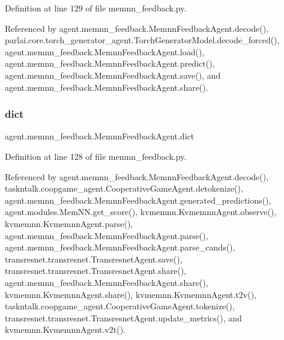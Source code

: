 Definition at line 129 of file memnn\+\_\+feedback.\+py.



Referenced by agent.\+memnn\+\_\+feedback.\+Memnn\+Feedback\+Agent.\+decode(), parlai.\+core.\+torch\+\_\+generator\+\_\+agent.\+Torch\+Generator\+Model.\+decode\+\_\+forced(), agent.\+memnn\+\_\+feedback.\+Memnn\+Feedback\+Agent.\+load(), agent.\+memnn\+\_\+feedback.\+Memnn\+Feedback\+Agent.\+predict(), agent.\+memnn\+\_\+feedback.\+Memnn\+Feedback\+Agent.\+save(), and agent.\+memnn\+\_\+feedback.\+Memnn\+Feedback\+Agent.\+share().

\mbox{\label{classagent_1_1memnn__feedback_1_1MemnnFeedbackAgent_a62aa745115d5a92505ba3009729d847b}} 
\subsubsection{\texorpdfstring{dict}{dict}}
{\footnotesize\ttfamily agent.\+memnn\+\_\+feedback.\+Memnn\+Feedback\+Agent.\+dict}



Definition at line 128 of file memnn\+\_\+feedback.\+py.



Referenced by agent.\+memnn\+\_\+feedback.\+Memnn\+Feedback\+Agent.\+decode(), taskntalk.\+coopgame\+\_\+agent.\+Cooperative\+Game\+Agent.\+detokenize(), agent.\+memnn\+\_\+feedback.\+Memnn\+Feedback\+Agent.\+generated\+\_\+predictions(), agent.\+modules.\+Mem\+N\+N.\+get\+\_\+score(), kvmemnn.\+Kvmemnn\+Agent.\+observe(), kvmemnn.\+Kvmemnn\+Agent.\+parse(), agent.\+memnn\+\_\+feedback.\+Memnn\+Feedback\+Agent.\+parse(), agent.\+memnn\+\_\+feedback.\+Memnn\+Feedback\+Agent.\+parse\+\_\+cands(), transresnet.\+transresnet.\+Transresnet\+Agent.\+save(), transresnet.\+transresnet.\+Transresnet\+Agent.\+share(), agent.\+memnn\+\_\+feedback.\+Memnn\+Feedback\+Agent.\+share(), kvmemnn.\+Kvmemnn\+Agent.\+share(), kvmemnn.\+Kvmemnn\+Agent.\+t2v(), taskntalk.\+coopgame\+\_\+agent.\+Cooperative\+Game\+Agent.\+tokenize(), transresnet.\+transresnet.\+Transresnet\+Agent.\+update\+\_\+metrics(), and kvmemnn.\+Kvmemnn\+Agent.\+v2t().

\mbox{\label{classagent_1_1memnn__feedback_1_1MemnnFeedbackAgent_a5beb885645239070a3a818a3006f49d8}} 
